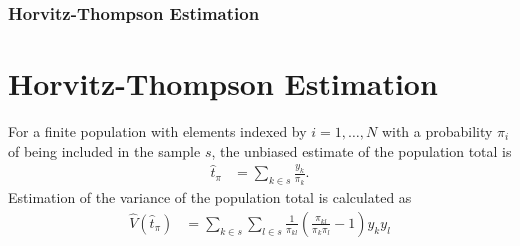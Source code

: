 \documentclass{beamer}
\begin{document}
%
\begin{frame}
  \frametitle{Horvitz-Thompson Estimation}
  \section{Horvitz-Thompson Estimation}
  For a finite population with elements indexed by $i = 1, \ldots, N$ with a probability $\pi_i$ of being included in the sample $s$, the unbiased estimate of the population total is 
  \begin{align*}
    \hat{t}_\pi &  = \sum_{k \in s} \frac{y_k} {\pi_k}.
  \end{align*}
  Estimation of the variance of the population total is calculated as
  \begin{align*}
    \hat{V}(\hat{t}_\pi) &  = \sum_{k \in s} \sum_{l \in s} \frac{1} {\pi_{kl}} \left( \frac{\pi_{kl}} {\pi_k \pi_l} - 1 \right) y_k y_l
  \end{align*}
\end{frame}
\end{document}
